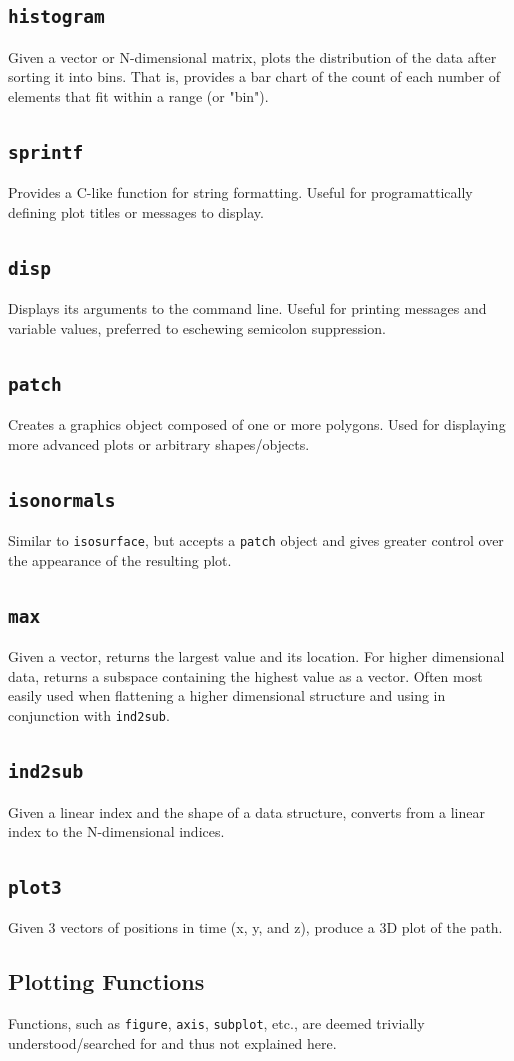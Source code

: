 \documentclass[journal]{IEEEtran}
\def\code#1{\texttt{#1}}
\begin{document}
\subsection{\code{histogram}}
Given a vector or N-dimensional matrix, plots the distribution of the data after sorting it into bins. That is, provides a bar chart of the count of each number of elements that fit within a range (or "bin").
\subsection{\code{sprintf}}
Provides a C-like function for string formatting. Useful for programattically defining plot titles or messages to display.
\subsection{\code{disp}}
Displays its arguments to the command line. Useful for printing messages and variable values, preferred to eschewing semicolon suppression.
\subsection{\code{patch}}
Creates a graphics object composed of one or more polygons. Used for displaying more advanced plots or arbitrary shapes/objects.
\subsection{\code{isonormals}}
Similar to \code{isosurface}, but accepts a \code{patch} object and gives greater control over the appearance of the resulting plot.
\subsection{\code{max}}
Given a vector, returns the largest value and its location. For higher dimensional data, returns a subspace containing the highest value as a vector. Often most easily used when flattening a higher dimensional structure and using in conjunction with \code{ind2sub}.
\subsection{\code{ind2sub}}
Given a linear index and the shape of a data structure, converts from a linear index to the N-dimensional indices.
\subsection{\code{plot3}}
Given 3 vectors of positions in time (x, y, and z), produce a 3D plot of the path.
\subsection{Plotting Functions}
Functions, such as \code{figure}, \code{axis}, \code{subplot}, etc., are deemed trivially understood/searched for and thus not explained here.
\end{document}
